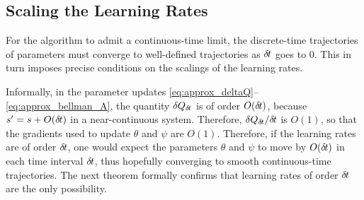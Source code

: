 \subsection{Scaling the Learning Rates}
\label{subsec:lr}

For the algorithm to admit a continuous-time limit, the discrete-time trajectories
of parameters must converge to well-defined trajectories as ${\delta\hspace{-.1em}t}$ goes to
$0$.
This in turn imposes precise conditions on the scalings of the
learning rates.%

Informally, in the parameter updates
\eqref{eq:approx_deltaQ}--\eqref{eq:approx_bellman_A}, the quantity $\delta
Q_{\delta\hspace{-.1em}t}$ is of order $O({\delta\hspace{-.1em}t})$, because $s'=s+O({\delta\hspace{-.1em}t})$ in a
near-continuous system. Therefore, $\delta
Q_{\delta\hspace{-.1em}t}/{\delta\hspace{-.1em}t}$ is $O(1)$, so that the gradients used to
update $\theta$ and $\psi$ are $O(1)$. Therefore, if the
learning rates are of order ${\delta\hspace{-.1em}t}$, one would expect 
the parameters $\theta$ and $\psi$ to move by $O({\delta\hspace{-.1em}t})$ in
each time interval ${\delta\hspace{-.1em}t}$, thus hopefully converging to smooth
continuous-time trajectories. The next theorem formally confirms that
learning rates of order ${\delta\hspace{-.1em}t}$ are the only possibility.


